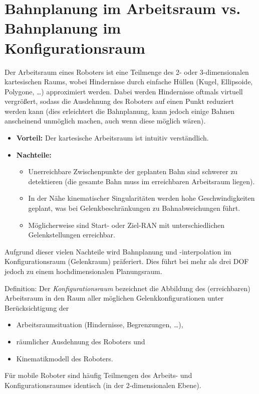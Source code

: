 	\section{Bahnplanung im Arbeitsraum vs. Bahnplanung im Konfigurationsraum}
		Der Arbeitsraum eines Roboters ist eine Teilmenge des 2- oder 3-dimensionalen kartesischen Raums, wobei Hindernisse durch einfache Hüllen (Kugel, Ellipsoide, Polygone, \dots) approximiert werden. Dabei werden Hindernisse oftmals virtuell vergrößert, sodass die Ausdehnung des Roboters auf einen Punkt reduziert werden kann (dies erleichtert die Bahnplanung, kann jedoch einige Bahnen anscheinend unmöglich machen, auch wenn diese möglich wären).
		\begin{itemize}
			\item \textbf{Vorteil:} Der kartesische Arbeitsraum ist intuitiv verständlich.
			\item \textbf{Nachteile:}
				\begin{itemize}
					\item Unerreichbare Zwischenpunkte der geplanten Bahn sind schwerer zu detektieren (die gesamte Bahn muss im erreichbaren Arbeitsraum liegen).
					\item In der Nähe kinematischer Singularitäten werden hohe Geschwindigkeiten geplant, was bei Gelenkbeschränkungen zu Bahnabweichungen führt.
					\item Möglicherweise sind Start- oder Ziel-RAN mit unterschiedlichen Gelenkstellungen erreichbar.
				\end{itemize}
		\end{itemize}
		Aufgrund dieser vielen Nachteile wird Bahnplanung und -interpolation im Konfigurationsraum (Gelenkraum) präferiert. Dies führt bei mehr als drei DOF jedoch zu einem hochdimensionalen Planungsraum.
		
		Definition: Der \emph{Konfigurationsraum} bezeichnet die Abbildung des (erreichbaren) Arbeitsraum in den Raum aller möglichen Gelenkkonfigurationen unter Berücksichtigung der
		\begin{itemize}
			\item Arbeitsraumsituation (Hindernisse, Begrenzungen, \dots),
			\item räumlicher Ausdehnung des Roboters und
			\item Kinematikmodell des Roboters.
		\end{itemize}
		Für mobile Roboter sind häufig Teilmengen des Arbeits- und Konfigurationsraumes identisch (\zB in der 2-dimensionalen Ebene).

